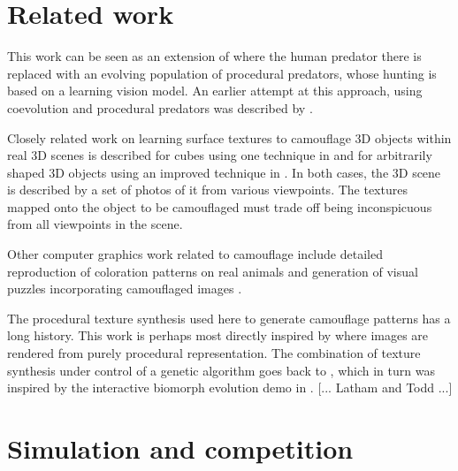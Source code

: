 \documentclass[sigconf]{acmart}
\begin{document}
\section{Related work}
This work can be seen as an extension of \citet{Reynolds2011} where the human predator there is replaced with an evolving population of procedural predators, whose hunting is based on a learning vision model. An earlier attempt at this approach, using coevolution and procedural predators was described by \citet{harrington_coevolution_2014}.
\par
Closely related work on learning surface textures to camouflage 3D objects within real 3D scenes is described for cubes using one technique in \citet{owens_camouflaging_2014} and for arbitrarily shaped 3D objects using an improved technique in \citet{guo_ganmouflage_2022}. In both cases, the 3D scene is described by a set of photos of it from various viewpoints. The textures mapped onto the object to be camouflaged must trade off being inconspicuous from all viewpoints in the scene.
\par
Other computer graphics work related to camouflage include detailed reproduction of coloration patterns on real animals \cite{de_gomensoro_malheiros_leopard_2020} and generation of visual puzzles incorporating camouflaged images \cite{chu_camo_image_2010} \cite{Zhang_Yin_Nie_Zheng_2020}.
\par
The procedural texture synthesis used here to generate camouflage patterns has a long history. This work is perhaps most directly inspired by \citet{perlin_image_1985} where images are rendered from purely procedural representation. The combination of texture synthesis under control of a genetic algorithm goes back to \citet{sims_artificial_1991}, which in turn was inspired by the interactive biomorph evolution demo in \citet{dawkins_blind_1986}. [... Latham and Todd ...]
\par
[... TexSyn \textbf{[OK to mention name?]} is based on the “strongly typed” variant of Genetic Programming known as STGP \cite{montana_strongly_1995}, one of several grammar-based GP variants \cite{Mckay_2010}. ...
GP generally: 
\citet{cramer_representation_1985} and
\citet{koza_genetic_1992}
...]


\section{Simulation and competition}
\end{document}
